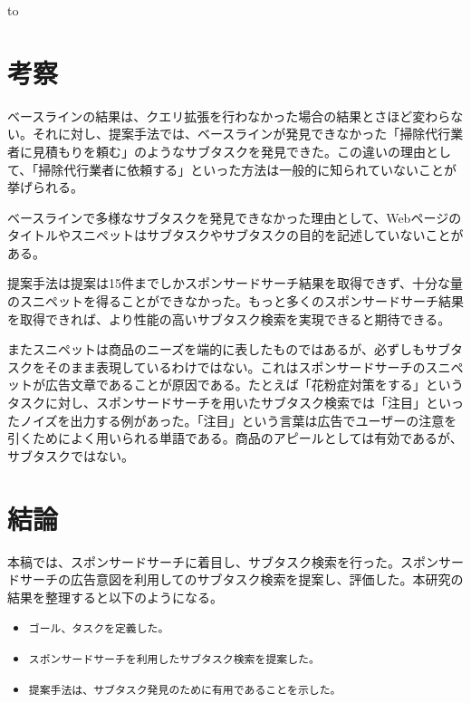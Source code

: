 \documentclass[submit,techreq]{ipsj}
\def\|{\verb|}
\begin{document}
\begin{table}[tb] 
\caption{「結婚する」でのサブタスク検索の結果} 
\label{tab:result4}
\hbox to
\end{table}

%5
\section{考察}


ベースラインの結果は、クエリ拡張を行わなかった場合の結果とさほど変わらない。それに対し、提案手法では、ベースラインが発見できなかった「掃除代行業者に見積もりを頼む」のようなサブタスクを発見できた。この違いの理由として、「掃除代行業者に依頼する」といった方法は一般的に知られていないことが挙げられる。

ベースラインで多様なサブタスクを発見できなかった理由として、Webページのタイトルやスニペットはサブタスクやサブタスクの目的を記述していないことがある。


提案手法は提案は15件までしかスポンサードサーチ結果を取得できず、十分な量のスニペットを得ることができなかった。もっと多くのスポンサードサーチ結果を取得できれば、より性能の高いサブタスク検索を実現できると期待できる。

またスニペットは商品のニーズを端的に表したものではあるが、必ずしもサブタスクをそのまま表現しているわけではない。これはスポンサードサーチのスニペットが広告文章であることが原因である。たとえば「花粉症対策をする」というタスクに対し、スポンサードサーチを用いたサブタスク検索では「注目」といったノイズを出力する例があった。「注目」という言葉は広告でユーザーの注意を引くためによく用いられる単語である。商品のアピールとしては有効であるが、サブタスクではない。


%6
\section{結論}
本稿では、スポンサードサーチに着目し、サブタスク検索を行った。スポンサードサーチの広告意図を利用してのサブタスク検索を提案し、評価した。本研究の結果を整理すると以下のようになる。


\begin{itemize}
\item \|ゴール、タスクを定義した。|
\item \|スポンサードサーチを利用したサブタスク検索を提案した。|
\item \|提案手法は、サブタスク発見のために有用であることを示した。|
\end{itemize}
\end{document}
